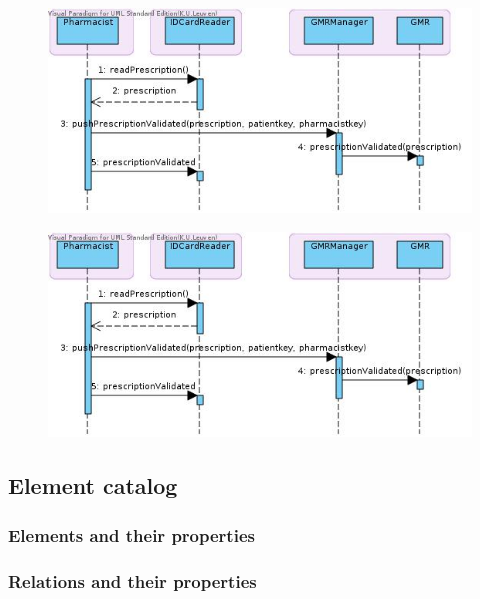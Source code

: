 \documentclass[a4paper,10pt]{book}
\begin{document}
\begin{center}
    \begin{figure}
      \includegraphics{../images/validatePrescription.jpg}
    \end{figure}
  \end{center}

\begin{center}
    \begin{figure}
      \includegraphics{../images/validatePrescription.jpg}
    \end{figure}
  \end{center}

\subsection{Element catalog}

\subsubsection{Elements and their properties}

\subsubsection{Relations and their properties}
\end{document}
